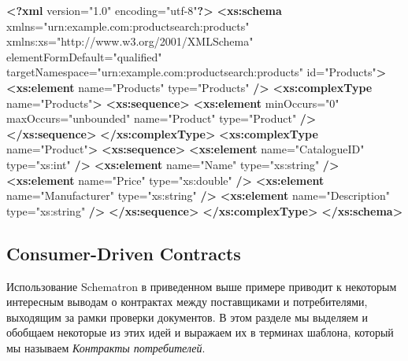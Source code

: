 \documentclass[11pt]{article}
\newenvironment{Shaded}{}{}
\newcommand{\KeywordTok}[1]{\textcolor[rgb]{0.00,0.44,0.13}{\textbf{{#1}}}}
\newcommand{\StringTok}[1]{\textcolor[rgb]{0.25,0.44,0.63}{{#1}}}
\newcommand{\OtherTok}[1]{\textcolor[rgb]{0.00,0.44,0.13}{{#1}}}
\newcommand{\NormalTok}[1]{{#1}}
\begin{document}
\begin{Shaded}
\begin{Highlighting}[]
\KeywordTok{<?xml}\NormalTok{ version="1.0" encoding="utf-8"}\KeywordTok{?>}
\KeywordTok{<xs:schema}\OtherTok{ xmlns=}\StringTok{"urn:example.com:productsearch:products"} 
\OtherTok{  xmlns:xs=}\StringTok{"http://www.w3.org/2001/XMLSchema"}
\OtherTok{  elementFormDefault=}\StringTok{"qualified"} 
\OtherTok{  targetNamespace=}\StringTok{"urn:example.com:productsearch:products"} 
\OtherTok{  id=}\StringTok{"Products"}\KeywordTok{>}
  \KeywordTok{<xs:element}\OtherTok{ name=}\StringTok{"Products"}\OtherTok{ type=}\StringTok{"Products"} \KeywordTok{/>}
  \KeywordTok{<xs:complexType}\OtherTok{ name=}\StringTok{"Products"}\KeywordTok{>}
    \KeywordTok{<xs:sequence>}
      \KeywordTok{<xs:element}\OtherTok{ minOccurs=}\StringTok{"0"}\OtherTok{ maxOccurs=}\StringTok{"unbounded"}\OtherTok{ name=}\StringTok{"Product"}\OtherTok{ type=}\StringTok{"Product"} \KeywordTok{/>}
    \KeywordTok{</xs:sequence>}
  \KeywordTok{</xs:complexType>}
  \KeywordTok{<xs:complexType}\OtherTok{ name=}\StringTok{"Product"}\KeywordTok{>}
    \KeywordTok{<xs:sequence>}
      \KeywordTok{<xs:element}\OtherTok{ name=}\StringTok{"CatalogueID"}\OtherTok{ type=}\StringTok{"xs:int"} \KeywordTok{/>}
      \KeywordTok{<xs:element}\OtherTok{ name=}\StringTok{"Name"}\OtherTok{ type=}\StringTok{"xs:string"} \KeywordTok{/>}
      \KeywordTok{<xs:element}\OtherTok{ name=}\StringTok{"Price"}\OtherTok{ type=}\StringTok{"xs:double"} \KeywordTok{/>}
      \KeywordTok{<xs:element}\OtherTok{ name=}\StringTok{"Manufacturer"}\OtherTok{ type=}\StringTok{"xs:string"} \KeywordTok{/>}
      \KeywordTok{<xs:element}\OtherTok{ name=}\StringTok{"Description"}\OtherTok{ type=}\StringTok{"xs:string"} \KeywordTok{/>}
    \KeywordTok{</xs:sequence>}
  \KeywordTok{</xs:complexType>}
\KeywordTok{</xs:schema>}
\end{Highlighting}
\end{Shaded}

    \subsection{Consumer-Driven Contracts}\label{consumer-driven-contracts}

Использование Schematron в приведенном выше примере приводит к некоторым
интересным выводам о контрактах между поставщиками и потребителями,
выходящим за рамки проверки документов. В этом разделе мы выделяем и
обобщаем некоторые из этих идей и выражаем их в терминах шаблона,
который мы называем \emph{Контракты потребителей}.
\end{document}

